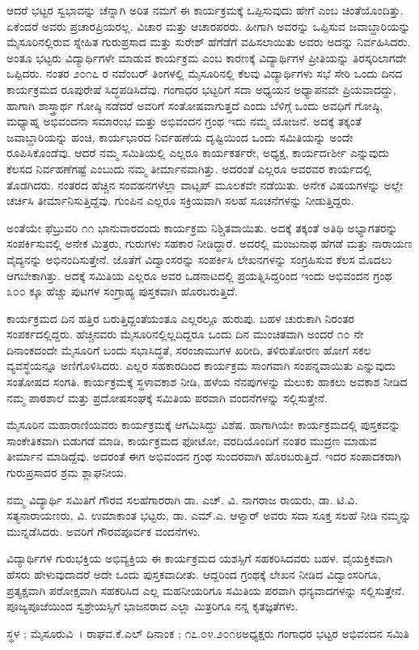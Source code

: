 ಆದರೆ ಭಟ್ಟರ ಸ್ವಭಾವನ್ನು ಚೆನ್ನಾಗಿ ಅರಿತ ನಮಗೆ ಈ ಕಾರ್ಯಕ್ರಮಕ್ಕೆ ಒಪ್ಪಿಸುವುದು ಹೇಗೆ ಎಂಬ ಚಿಂತೆಯೊಂದಿತ್ತು. ಏಕೆಂದರೆ ಅವರು ಪ್ರಚಾರಪ್ರಿಯರಲ್ಲ. ವಿಚಾರ ಮತ್ತು ಆಚಾರಪರರು. ಹೀಗಾಗಿ ಅವರನ್ನು ಒಪ್ಪಿಸುವ ಜವಾಬ್ದಾರಿಯನ್ನು ಮೈಸೂರಿನಲ್ಲಿರುವ ಸ್ನೇಹಿತ ಗುರುಪ್ರಸಾದ ಮತ್ತು ಸುರೇಶ್ ಹೆಗೆಡೆಗೆ ವಹಿಸಲಾಯಿತು ಅವರು ಅದನ್ನು ನಿರ್ವಹಿಸಿದರು. ಅಂತೂ ಭಟ್ಟರು ವಿದ್ಯಾರ್ಥಿಗಳೇ ಮಾಡುವ ಕಾರ್ಯಕ್ರಮ ಎಂಬ ಕಾರಣಕ್ಕೆ ವಿದ್ಯಾರ್ಥಿಗಳ ಪ್ರೀತಿಯನ್ನು ತಿರಸ್ಕರಿಲಾಗದೇ ಒಪ್ಪಿದರು. ನಂತರ ೨೦೧೭ ರ ನವೆಂಬರ್ ತಿಂಗಳಲ್ಲಿ ಮೈಸೂರಿನಲ್ಲಿ ಕೆಲವು ವಿದ್ಯಾರ್ಥಿಗಳು ಸಭೆ ಸೇರಿ ಒಂದು ದಿನದ ಕಾರ್ಯಕ್ರಮದ ರೂಪುರೇಷೆ ಸಿದ್ಧಪಡಿಸಿದೆವು. ಗಂಗಾಧರ ಭಟ್ಟರಿಗೆ ಸದಾ ಅಧ್ಯಯನ ಅಧ್ಯಾಪನವೇ ಪ್ರಿಯವಾದದ್ದು, ಹಾಗಾಗಿ ಶಾಸ್ತ್ರಾರ್ಥ ಗೋಷ್ಠಿ ನಡೆದರೆ ಅವರಿಗೆ ಸಂತೋಷವಾಗುತ್ತದೆ ಎಂದು ಬೆಳಿಗ್ಗೆ ಒಂದು ಅವಧಿಗೆ ಗೋಷ್ಠಿ, ಮಧ್ಯಾಹ್ನ ಅಭಿವಂದನಾ ಸಮಾರಂಭ ಮತ್ತು ಅಭಿವಂದನ ಗ್ರಂಥ ಇದು ನಮ್ಮ ಯೋಜನೆ. ಅದಕ್ಕೆ ತಕ್ಕಂತೆ ಜವಾಬ್ದಾರಿಯನ್ನು ಹಂಚಿ, ಕಾರ್ಯಭಾರದ ನಿರ್ವಹಣೆಯ ದೃಷ್ಟಿಯಿಂದ ಒಂದು ಸಮಿತಿಯನ್ನು ಅಂದೇ ರೂಪಿಸಿಕೊಂಡೆವು. ಆದರೆ ನಮ್ಮ ಸಮಿತಿಯಲ್ಲಿ ಎಲ್ಲರೂ ಕಾರ್ಯಕರ್ತರೇ, ಅಧ್ಯಕ್ಷ, ಕಾರ್ಯದrರ್ಶೀ ಎನ್ನುವುದು ಕೆಲಸದ ನಿರ್ವಹಣೆಗಷ್ಟೆ ಎಂಬುದು ನಮ್ಮ ತೀರ್ಮಾನವಾಗಿತ್ತು. ಅದರಂತೆ ಎಲ್ಲರೂ ಅವರವರ ಕಾರ್ಯದಲ್ಲಿ ತೊಡಗಿದರು. ನಂತರದ ಹೆಚ್ಚಿನ ಸಂವಹನಗಳೆಲ್ಲಾ ವಾಟ್ಸಪ್ ಮೂಲಕವೇ ನಡೆಯಿತು. ಅನೇಕ ವಿಷಯಗಳನ್ನು ಅಲ್ಲೇ ಚರ್ಚಿಸಿ ತೀರ್ಮಾನಿಸುತ್ತಿದ್ದೆವು. ಗುಂಪಿನ ಎಲ್ಲರೂ ಸಕ್ರಿಯವಾಗಿ ಸಲಹೆ ಸೂಚನೆಗಳನ್ನು ನೀಡುತ್ತಿದ್ದರು.

ಅಂತೆಯೇ ಫೆಬ್ರುವರಿ ೧೧ ಭಾನುವಾರದಂದು ಕಾರ್ಯಕ್ರಮ ನಿಶ್ಚಿತವಾಯಿತು. ಅದಕ್ಕೆ ತಕ್ಕಂತೆ ಅತಿಥಿ ಅಭ್ಯಾಗತರನ್ನು ಸಂಪರ್ಕಿಸುವಲ್ಲಿ ಅನೇಕ ಮಿತ್ರರು, ಗುರುಗಳು ಸಹಕಾರ ನೀಡಿದ್ದಾರೆ. ಅದರಲ್ಲಿ ಮಂಜುನಾಥ ಹೆಗಡೆ ಮತ್ತು ನಾರಾಯಣ ವೈದ್ಯನನ್ನು ಅಭಿನಂದಿಸುತ್ತೇನೆ. ಜೊತೆಗೆ ವಿದ್ವಾಂಸರನ್ನು ಸಂಪರ್ಕಿಸಿ ಲೇಖನಗಳನ್ನು ಸಂಗ್ರಹಿಸುವ ಕೆಲಸ ಮೊದಲು ಆಗಬೇಕಾಗಿತ್ತು. ಅದಕ್ಕೆ ಸಮಿತಿಯ ಎಲ್ಲರೂ ಅವರ ಒಡನಾಟದಲ್ಲಿ ಪ್ರಯತ್ನಿಸಿದ್ದರಿಂದ ಇಂದು ಅಭಿವಂದನ ಗ್ರಂಥ ೩೦೦ ಕ್ಕೂ ಹೆಚ್ಚು ಪುಟಗಳ ಸಂಗ್ರಾಹ್ಯ ಪುಸ್ತಕವಾಗಿ ಹೊರಬರುತ್ತಿದೆ.

ಕಾರ್ಯಕ್ರಮದ ದಿನ ಹತ್ತಿರ ಬರುತ್ತಿದ್ದಂತೆಯಂತೂ ಎಲ್ಲರಲ್ಲೂ ಹುರುಪು. ಬಹಳ ಚುರುಕಾಗಿ ನಿರಂತರ ಸಂಪರ್ಕದಲ್ಲಿದ್ದರು. ಹೆಚ್ಚಿನವರು ಮೈಸೂರಿನಲ್ಲಿಲ್ಲದಿದ್ದರೂ ಒಂದು ದಿನ ಮುಂಚಿತವಾಗಿ ಅಂದರೆ ೧೦ ನೇ ದಿನಾಂಕದಂದೇ ಮೈಸೂರಿಗೆ ಬಂದು ಸಭಾಸಿದ್ಧತೆ, ಸರಂಜಾಮುಗಳ ಖರೀದಿ, ತಳಿರುತೋರಣ ಹೋಗೆ ಸಕಲ ವ್ಯವಸ್ಥೆಯನ್ನೂ ಅಣಿಗೊಳಿಸಿದರು. ಎಲ್ಲರ ಸಹಕಾರದಿಂದ ಕಾರ್ಯಕ್ರಮ ಸಾಂಗವಾಗಿ ಸಂಪನ್ನವಾಯಿತು ಎನ್ನುವುದು ಸಂತೋಷದ ಸಂಗತಿ. ಕಾರ್ಯಕ್ರಮಕ್ಕೆ ಸ್ಥಳಾವಕಾಶ ನೀಡಿ, ಹಳೆಯ ನೆನಪುಗಳನ್ನು ಮೆಲುಕು ಹಾಕಲು ಅವಕಾಶ ನೀಡಿದ ನಮ್ಮ ಪಾಠಶಾಲೆ ಮತ್ತು ಪ್ರದೋಷಸಂಘಕ್ಕೆ ಸಮಿತಿಯ ಪರವಾಗಿ ವಂದನೆಗಳನ್ನು ಸಲ್ಲಿಸುತ್ತೇನೆ.

ಮೈಸೂರಿನ ಮಹಾರಾಣಿಯವರು ಕಾರ್ಯಕ್ರಮಕ್ಕೆ ಆಗಮಿಸಿದ್ದು ವಿಶೆಷ. ಹಾಗಾಗಿಯೇ ಕಾರ್ಯಕ್ರಮದಲ್ಲಿ ಪುಸ್ತಕವನ್ನು ಸಾಂಕೇತಿಕವಾಗಿ ಬಿಡುಗಡೆ ಮಾಡಿ, ಕಾರ್ಯಕ್ರಮದ ಫೋಟೋ, ವರದಿಯೊಂದಿಗೆ ನಂತರ ಮುದ್ರಣ ಮಾಡುವ ತೀರ್ಮಾನ ಮಾಡಿದ್ದೆವು. ಅದರಂತೆ ಈಗ ಅಭಿವಂದನ ಗ್ರಂಥ ಸುಂದರವಾಗಿ ಹೊರಬರುತ್ತಿದೆ. ಇದರ ಸಂಪಾದಕರಾಗಿ ಗುರುಪ್ರಸಾದರ ಶ್ರಮ ಶ್ಲಾಘನೀಯ.

ನಮ್ಮ ವಿದ್ಯಾರ್ಥಿ ಸಮಿತಿಗೆ ಗೌರವ ಸಲಹೆಗಾರರಾಗಿ ಡಾ. ಎಚ್. ವಿ. ನಾಗರಾಜ ರಾಯರು, ಡಾ. ಟಿ.ವಿ. ಸತ್ಯನಾರಾಯಣರು, ವಿ. ಉಮಾಕಾಂತ ಭಟ್ಟರು, ಡಾ. ಎಮ್.ಎ. ಆಳ್ವಾರ್ ಅವರು ಸದಾ ಸೂಕ್ತ ಸಲಹೆ ನೀಡಿ ನಮ್ಮನ್ನು ಮುನ್ನಡೆಸಿದರು. ಅವರಿಗೆ ಗೌರವಪೂರ್ವಕ ವಂದನೆಗಳು.

ವಿದ್ಯಾರ್ಥಿಗಳ ಗುರುಭಕ್ತಿಯ ಅಭಿವ್ಯಕ್ತಿಯ ಈ ಕಾರ್ಯಕ್ರಮದ ಯಶಸ್ಸಿಗೆ ಸಹಕರಿಸಿದವರು ಬಹಳ. ವೈಯಕ್ತಿಕವಾಗಿ ಹೆಸರು ಹೇಳುವುದಾದರೆ ಅದೇ ಒಂದು ಪುಸ್ತಕವಾದೀತು. ಆದ್ದರಿಂದ ಗ್ರಂಥಕ್ಕೆ ಲೇಖನ ನೀಡಿದ ವಿದ್ವಾಂಸರಿಗೂ, ಪ್ರತ್ಯಕ್ಷವಾಗಿ ಪರೋಕ್ಷವಾಗಿ ಸಹಕರಿಸಿದ ಎಲ್ಲ ಮಹನೀಯರಿಗೂ ಸಮಿತಿಯ ಪರವಾಗಿ ಧನ್ಯವಾದಗಳನ್ನು ಸಲ್ಲಿಸುತ್ತೇನೆ. ಪೂಜ್ಯಪೂಜೆಯಿಂದ ಸ್ವಶ್ರೇಯಸ್ಸಿಗೆ ಭಾಜನರಾದ ಎಲ್ಲಾ ಮಿತ್ರರಿಗೂ ನನ್ನ ಕೃತಜ್ಞತೆಗಳು.

ಸ್ಥಳ ; ಮೈಸೂರು\hfill				           ವಿ~। ರಾಘವ.ಕೆ.ಎಲ್
ದಿನಾಂಕ ; ೧೭.೦೪.೨೦೧೮\hfill  						    ಅಧ್ಯಕ್ಷರು
ಗಂಗಾಧರ ಭಟ್ಟರ ಅಭಿವಂದನ ಸಮಿತಿ


\articleend
